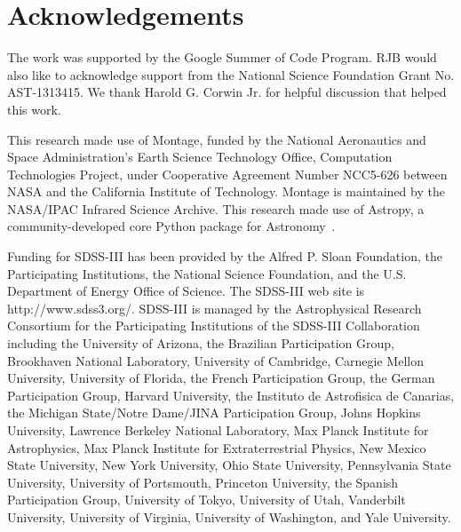 \documentclass[authoryear, 12pt, 5p, times]{elsarticle}
\begin{document}
\section*{Acknowledgements}
\footnotesize

The work was supported by the Google Summer of Code Program. RJB would also like to acknowledge support from the National Science Foundation Grant No. AST-1313415. We thank Harold G. Corwin Jr. for helpful discussion that helped this work. 

This research made use of Montage, funded by the National Aeronautics and Space Administration's Earth Science Technology Office, Computation Technologies Project, under Cooperative Agreement Number NCC5-626 between NASA and the California Institute of Technology. Montage is maintained by the NASA/IPAC Infrared Science Archive. This research made use of Astropy, a community-developed core Python package for Astronomy~\citep{astropy}.

Funding for SDSS-III has been provided by the Alfred P. Sloan Foundation, the Participating Institutions, the National Science Foundation, and the U.S. Department of Energy Office of Science. The SDSS-III web site is http://www.sdss3.org/. SDSS-III is managed by the Astrophysical Research Consortium for the Participating Institutions of the SDSS-III Collaboration including the University of Arizona, the Brazilian Participation Group, Brookhaven National Laboratory, University of Cambridge, Carnegie Mellon University, University of Florida, the French Participation Group, the German Participation Group, Harvard University, the Instituto de Astrofisica de Canarias, the Michigan State/Notre Dame/JINA Participation Group, Johns Hopkins University, Lawrence Berkeley National Laboratory, Max Planck Institute for Astrophysics, Max Planck Institute for Extraterrestrial Physics, New Mexico State University, New York University, Ohio State University, Pennsylvania State University, University of Portsmouth, Princeton University, the Spanish Participation Group, University of Tokyo, University of Utah, Vanderbilt University, University of Virginia, University of Washington, and Yale University.



\end{document}
